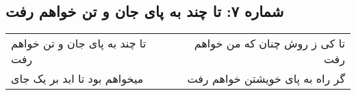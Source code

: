 \begin{center}
\section*{شماره ۷: تا چند به پای جان و تن خواهم رفت}
\label{sec:007}
\begin{longtable}{l p{0.5cm} r}
تا چند به پای جان و تن خواهم رفت
&&
تا کی ز روش چنان که من خواهم رفت
\\
میخواهم بود تا ابد بر یک جای
&&
گر راه به پای خویشتن خواهم رفت
\\
\end{longtable}
\end{center}
